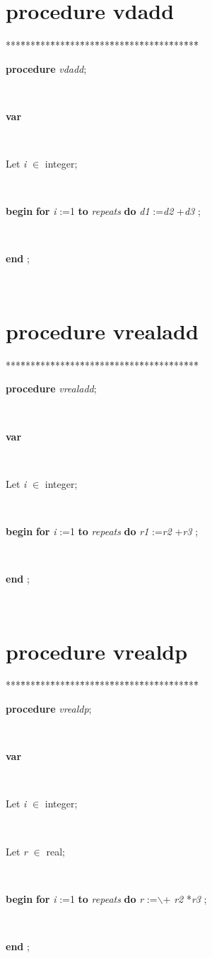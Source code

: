 \documentclass[10pt, a4paper]{article}
\begin{document}
\section{procedure vdadd}\label{sec:vectest/dovectestvdadd}

\begin{tabbing}
***\=***\=***\=***\=***\=***\=***\=***\=***\=***\=***\=***\=***\=\kill
\parbox{14cm}{\textsf {\textbf {procedure } \textsf{\textit{vdadd}}; }}\\
\+\parbox{14cm}{\textsf{\textbf{var} }}\\
\parbox{14cm}{\textsf{Let \textit{i} $\in$ integer;}}\\
\-\<\+\parbox{14cm}{\textsf{\textbf{begin}      \textbf{for}  \textit{i} :=1 \textbf{to}  \textit{repeats}  \textbf{do}  \textit{d1} :=\textit{d2} +\textit{d3} ;}}\\
\<\-\parbox{14cm}{\textsf{\textbf{end} ;}}\\
\end{tabbing}
\section{procedure vrealadd}\label{sec:vectest/dovectestvrealadd}

\begin{tabbing}
***\=***\=***\=***\=***\=***\=***\=***\=***\=***\=***\=***\=***\=\kill
\parbox{14cm}{\textsf {\textbf {procedure } \textsf{\textit{vrealadd}}; }}\\
\+\parbox{14cm}{\textsf{\textbf{var} }}\\
\parbox{14cm}{\textsf{Let \textit{i} $\in$ integer;}}\\
\-\<\+\parbox{14cm}{\textsf{\textbf{begin}      \textbf{for}  \textit{i} :=1 \textbf{to}  \textit{repeats}  \textbf{do}  \textit{r1} :=\textit{r2} +\textit{r3} ;}}\\
\<\-\parbox{14cm}{\textsf{\textbf{end} ;}}\\
\end{tabbing}
\section{procedure vrealdp}\label{sec:vectest/dovectestvrealdp}

\begin{tabbing}
***\=***\=***\=***\=***\=***\=***\=***\=***\=***\=***\=***\=***\=\kill
\parbox{14cm}{\textsf {\textbf {procedure } \textsf{\textit{vrealdp}}; }}\\
\+\parbox{14cm}{\textsf{\textbf{var} }}\\
\parbox{14cm}{\textsf{Let \textit{i} $\in$ integer;}}\\
\parbox{14cm}{\textsf{Let \textit{r} $\in$ real;}}\\
\-\<\+\parbox{14cm}{\textsf{\textbf{begin}      \textbf{for}  \textit{i} :=1 \textbf{to}  \textit{repeats}  \textbf{do}  \textit{r} :=$ \backslash $+ \textit{r2} *\textit{r3} ;}}\\
\<\-\parbox{14cm}{\textsf{\textbf{end} ;}}\\
\end{tabbing}
\end{document}
